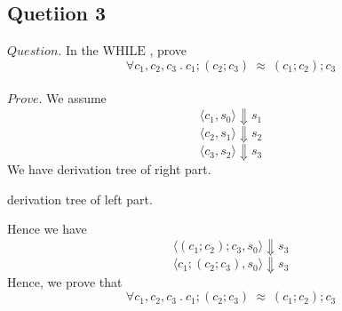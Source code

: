 \documentclass[a4paper,11pt,fleqn]{article}
\theoremstyle{mytheor}
\begin{document}
\subsection*{Quetiion 3}
$Question.$ In the $\mathrm{WHILE}$ , prove 
$$\forall c_1, c_2, c_3\  .\ c_1;(c_2;c_3)\ \approx \ (c_1;c_2);c_3$$
\\
$Prove.$ We assume 
$$\langle c_1, s_0 \rangle \Downarrow s_1$$
$$\langle c_2, s_1 \rangle \Downarrow s_2$$
$$\langle c_3, s_2 \rangle \Downarrow s_3$$
We have derivation tree of right part. 
\begin{prooftree}
\end{prooftree}
derivation tree of left part.
\begin{prooftree}
\end{prooftree}
Hence we have 
$$\langle (c_1;c_2);c_3, s_0 \rangle \Downarrow s_3$$
$$\langle c_1;(c_2;c_3), s_0 \rangle \Downarrow s_3$$
Hence, we prove that 
$$\forall c_1, c_2, c_3\  .\ c_1;(c_2;c_3)\ \approx \ (c_1;c_2);c_3$$
\end{document}
